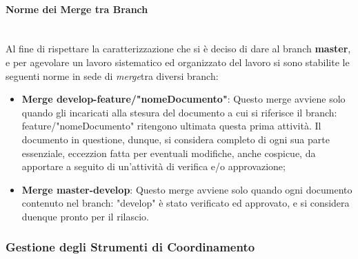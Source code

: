 \paragraph{Norme dei Merge tra Branch} ~\\
	Al fine di rispettare la caratterizzazione che si è deciso di dare al branch \textbf{master}, e per agevolare un lavoro sistematico ed organizzato del lavoro si sono stabilite le seguenti norme in sede di \textit{merge}\glossario tra diversi branch\glossario:
	\begin{itemize}
	\item \textbf{Merge develop-feature/"nomeDocumento"}: Questo merge avviene solo quando gli incaricati alla stesura del documento a cui si riferisce il branch: feature/"nomeDocumento" ritengono ultimata questa prima attività. Il documento in questione, dunque, si considera completo di ogni sua parte essenziale, eccezzion fatta per eventuali modifiche, anche cospicue, da apportare a seguito di un'attività di verifica e/o approvazione;
	\item \textbf{Merge master-develop}: Questo merge avviene solo quando ogni documento contenuto nel branch: "develop" è stato verificato ed approvato, e si considera duenque pronto per il rilascio.
	\end{itemize}


\subsubsection{Gestione degli Strumenti di Coordinamento}

